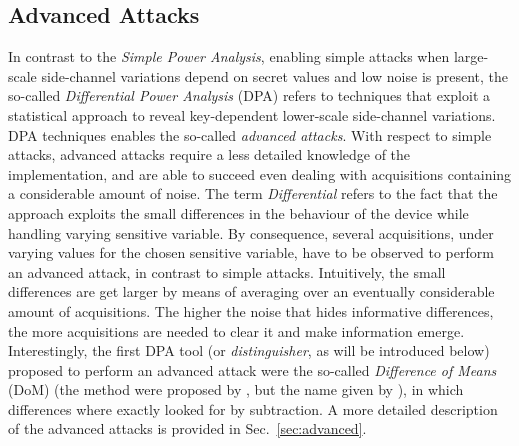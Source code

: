 \subsection{Advanced Attacks} 
In contrast to the \emph{Simple Power Analysis}, enabling simple attacks when large-scale side-channel variations depend on secret values and low noise is present, the so-called \emph{Differential Power Analysis} (DPA) refers to techniques that exploit  a statistical approach to reveal key-dependent lower-scale side-channel variations. DPA techniques enables the so-called \emph{advanced attacks}. With respect to simple attacks, advanced attacks  require a less detailed knowledge of the implementation, and are able to succeed even dealing with acquisitions containing a considerable amount of noise. The term \emph{Differential} refers to the fact that the approach exploits the small differences in the behaviour of the device while handling varying sensitive variable. By consequence,  several acquisitions, under varying values for the chosen sensitive variable, have to be observed to perform an advanced attack, in contrast to simple attacks. Intuitively, the small differences are get larger by means of averaging over an eventually considerable amount of acquisitions. The higher the noise that hides informative differences, the more acquisitions are needed to clear it and make information emerge. Interestingly, the first DPA tool (or \emph{distinguisher}, as will be introduced below) proposed to perform an advanced attack were the so-called \emph{Difference of Means} (DoM) (the method were proposed by \cite{kocher1999differential}, but the name given by \cite{Chari2003}),  in which differences where exactly looked for by subtraction. A more detailed description of the advanced attacks is provided in Sec.~\ref{sec:advanced}.\\



